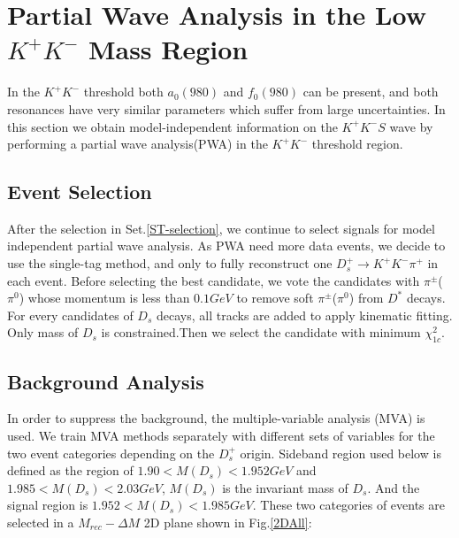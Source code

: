 \section{Partial Wave Analysis in the Low $K^{+}K^{-}$ Mass Region}
\par{In the $K^{+}K^{-}$ threshold both $a_{0}(980)$ and $f_{0}(980)$ can be present, and both resonances have very similar parameters which suffer from large uncertainties. In this section we obtain model-independent information on the $K^{+}K^{-} S$ wave by performing a partial wave analysis(PWA) in the  $K^{+}K^{-}$ threshold region.}
\subsection{Event Selection}
\label{MIPWASelection}
\par{
    After the selection in Set.\ref{ST-selection}, we continue to select signals for model independent partial wave analysis.
    As PWA need more data events, we decide to use the single-tag method, and only to fully reconstruct one $D_{s}^{+} \rightarrow K^{+}K^{-}\pi^{+}$ in each event. 
Before selecting the best candidate,  we vote the candidates with $\pi^{\pm}$($\pi^{0}$) whose momentum is less than $0.1GeV$ to remove soft $\pi^{\pm}$($\pi^{0}$) from $D^{*}$ decays.
For every candidates of $D_{s}$ decays, all tracks are added to apply kinematic fitting. 
Only mass of $D_{s}$ is constrained.Then we select the candidate with minimum $\chi_{1c}^{2}$.
}
\subsection{Background Analysis}
In order to suppress the background, the multiple-variable analysis (MVA) is used. We train MVA methods separately with different sets of variables for the two event categories depending on the $D_{s}^{+}$ origin. 
Sideband region used below is defined as the region of  $1.90 < M(D_{s}) < 1.952 GeV$ and   $1.985 < M(D_{s}) < 2.03 GeV$, $M(D_{s})$ is the invariant mass of $D_{s}$.
And the signal region is $1.952 < M(D_{s}) < 1.985 GeV$.
These two categories of events are selected in a $M_{rec}-\Delta{M}$ 2D plane shown in Fig.\ref{2DAll}:




